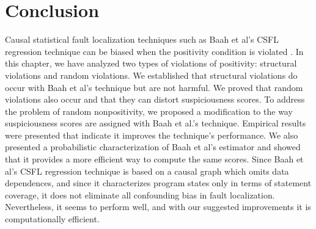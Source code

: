 \section{Conclusion}
Causal statistical fault localization techniques such as Baah et al’s CSFL regression technique can be biased when the positivity condition is violated \cite{bai2015importance}.  In this chapter, we have analyzed two types of violations of positivity: structural violations and random violations. We established that structural violations do occur with Baah et al’s technique but are not harmful.  We proved that random violations also occur and that they can distort suspiciousness scores.  To address the problem of random nonpositivity, we proposed a modification to the way suspiciousness scores are assigned with Baah et al.’s technique.  Empirical results were presented that indicate it improves the technique’s performance. We also presented a probabilistic characterization of Baah et al’s estimator and showed that it provides a more efficient way to compute the same scores. Since Baah et al’s CSFL regression technique is based on a causal graph which omits data dependences, and since it characterizes program states only in terms of statement coverage, it does not eliminate all confounding bias in fault localization.  Nevertheless, it seems to perform well, and with our suggested improvements it is computationally efficient.










